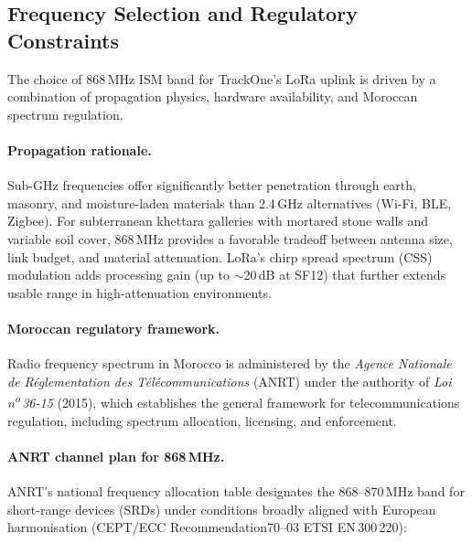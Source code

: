 \subsection{Frequency Selection and Regulatory Constraints}
\label{subsec:frequency-regulatory}

The choice of 868\,MHz \ac{ISM} band for TrackOne's \ac{LoRa} uplink is driven by a combination of
propagation physics, hardware availability, and Moroccan spectrum regulation.

\paragraph{Propagation rationale.}
Sub-GHz frequencies offer significantly better penetration through earth, masonry, and
moisture-laden materials than 2.4\,GHz alternatives (Wi-Fi, BLE, Zigbee).
For subterranean khettara galleries with mortared stone walls and variable soil cover,
868\,MHz provides a favorable tradeoff between antenna size, link budget, and
material attenuation.
\ac{LoRa}'s chirp spread spectrum (CSS) modulation adds processing gain
(up to $\sim$20\,dB at \ac{SF}12) that further extends usable range in high-attenuation
environments.

\paragraph{Moroccan regulatory framework.}
Radio frequency spectrum in Morocco is administered by the
\emph{Agence Nationale de Réglementation des Télécommunications} (ANRT)
under the authority of \emph{Loi n\textsuperscript{o}\,36-15} (2015), which establishes
the general framework for telecommunications regulation, including spectrum allocation,
licensing, and enforcement.

\paragraph{ANRT channel plan for 868\,MHz.}
\ac{ANRT}'s national frequency allocation table designates the 868--870\,MHz band for
short-range devices (\ac{SRD}s) under conditions broadly aligned with European
harmonisation (CEPT/ECC Recommendation70--03 ETSI EN\,300\,220):

